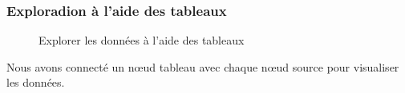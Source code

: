 \documentclass{article}
\begin{document}
            \subsubsection{Exploradion à l’aide des tableaux}
                \begin{figure}[h!]
                    \centering
                    \caption{Explorer les données à l’aide des tableaux}
                    \label{fig:5}
                \end{figure}
                \par Nous avons connecté un nœud tableau avec chaque nœud source pour visualiser les données.
\end{document}
